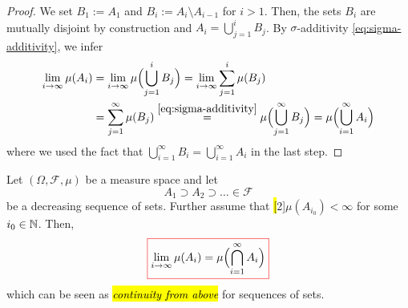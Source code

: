 \begin{proof}
We set $B_1 := A_1$ and $B_i := A_i \setminus A_{i-1}$ for $i > 1$.
Then, the sets $B_i$ are mutually disjoint by construction and
$A_i = \bigcup_{j=1}^{i} B_j$.
By $\sigma$-additivity \eqref{eq:sigma-additivity}, we infer
\[\begin{aligned}
  \lim_{i \to \infty} \mu(A_i)
  &=
  \lim_{i \to \infty} \mu\Bigl(\bigcup_{j=1}^{i} B_j\Bigr)
  =
  \lim_{i \to \infty} \sum_{j=1}^{i} \mu(B_j) \\
  &=
  \sum_{j=1}^{\infty} \mu(B_j)
  \stackrel{\eqref{eq:sigma-additivity}}{=}
\mu\Bigl(\bigcup_{j=1}^{\infty} B_j\Bigr)
=
\mu\Bigl(\bigcup_{i=1}^{\infty} A_i\Bigr)
\end{aligned}\]
where we used the fact that $\bigcup_{i=1}^{\infty} B_i = \bigcup_{i=1}^{\infty} A_i$ in the last step.
\end{proof}

\begin{theorem}\label{thm:continuity-from-above}
Let $(\Omega,\mathcal{F},\mu)$ be a measure space and let
\[
A_1 \supset A_2 \supset \dots \in \mathcal{F}
\]
be a decreasing sequence of sets.
Further assume that \hl[2]{$\mu(A_{i_0}) < \infty$} for some $i_0 \in \mathbb{N}$.
Then,
\begin{equation}
{\color{red}\boxed{\color{black}
  \lim_{i \to \infty} \mu(A_i)
  =
  \mu\Bigl(\bigcap_{i=1}^{\infty} A_i\Bigr)
}}
\label{eq:continuity-decreasing}
\end{equation}
which can be seen as \emph{\hl{continuity from above}} for sequences of sets.
\end{theorem}


